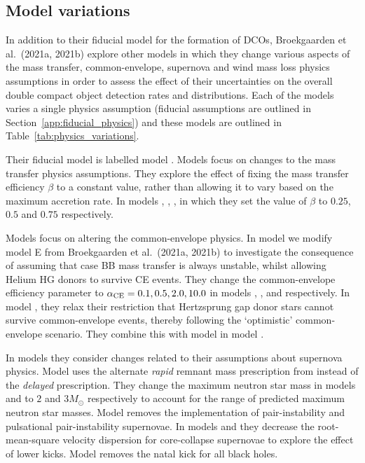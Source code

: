 \subsection{Model variations} \label{sec:variation_assumptions}
In addition to their fiducial model for the formation of DCOs, Broekgaarden et al.\ (2021a, 2021b) explore \nMinusOneModels{} other models in which they change various aspects of the mass transfer, common-envelope, supernova and wind mass loss physics assumptions in order to assess the effect of their uncertainties on the overall double compact object detection rates and distributions. Each of the models varies a single physics assumption (fiducial assumptions are outlined in Section~\ref{app:fiducial_physics}) and these models are outlined in Table~\ref{tab:physics_variations}.

Their fiducial model is labelled model \modFid{}. Models \modRangeMT{} focus on changes to the mass transfer physics assumptions. They explore the effect of fixing the mass transfer efficiency $\beta$ to a constant value, rather than allowing it to vary based on the maximum accretion rate. In models \modBetaLow{}, \modBetaMed{}, \modBetaHigh{}, in which they set the value of $\beta$ to $0.25$, $0.5$ and $0.75$ respectively.

Models \modRangeCE{} focus on altering the common-envelope physics. In model \modCaseBB{} we modify model E from Broekgaarden et al.\ (2021a, 2021b) to investigate the consequence of assuming that case BB mass transfer is always unstable, whilst allowing Helium HG donors to survive CE events. They change the common-envelope efficiency parameter to $\alpha_{\rm CE} = 0.1, 0.5, 2.0, 10.0$ in models \modAlphaLowest{}, \modAlphaLow{}, \modAlphaHigh{} and \modAlphaHighest{} respectively. In model \modOpt{}, they relax their restriction that Hertzsprung gap donor stars cannot survive common-envelope events, thereby following the `optimistic' common-envelope scenario. They combine this with model \modCaseBB{} in model \modCaseBBOpt{}.

In models \modRangeSN{} they consider changes related to their assumptions about supernova physics. Model \modRapid{} uses the alternate \textit{rapid} remnant mass prescription from \citet{Fryer+2012} instead of the \textit{delayed} prescription. They change the maximum neutron star mass in models \modNSLow{} and \modNSHigh{} to $2$ and $3 \unit{M_{\odot}}$ respectively to account for the range of predicted maximum neutron star masses. Model \modNoPISN{} removes the implementation of pair-instability and pulsational pair-instability supernovae. In models \modSigLow{} and \modSigLower{} they decrease the root-mean-square velocity dispersion for core-collapse supernovae to explore the effect of lower kicks. Model \modNoBH{} removes the natal kick for all black holes.


